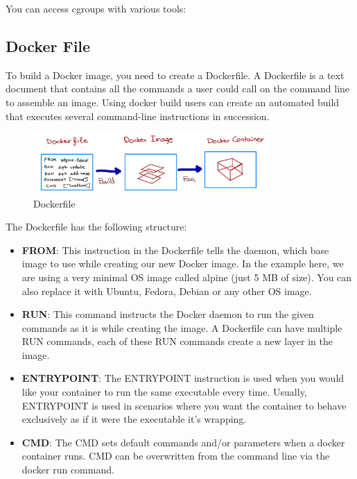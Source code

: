 You can access cgroups with various tools:

\subsection{Docker File}

To build a Docker image, you need to create a Dockerfile. A Dockerfile is a text
document that contains all the commands a user could call on the command line to
assemble an image. Using docker build users can create an automated build that 
executes several command-line instructions in succession.

\begin{figure}[H]
    \centering
    \includegraphics[width=0.8\textwidth]{assets/fig38.png}
    \caption{Dockerfile}
\end{figure}

The Dockerfile has the following structure:
\begin{itemize}
    \item \textbf{FROM}: This instruction in the Dockerfile tells the daemon, which
    base image to use while creating our new Docker image. In the
    example here, we are using a very minimal OS image called alpine
    (just 5 MB of size). You can also replace it with Ubuntu, Fedora,
    Debian or any other OS image.
    \item \textbf{RUN}: This command instructs the Docker daemon to run the given
    commands as it is while creating the image. A Dockerfile can have
    multiple RUN commands, each of these RUN commands create a
    new layer in the image.
    \item \textbf{ENTRYPOINT}:  The ENTRYPOINT instruction is used when you
    would like your container to run the same executable every time.
    Usually, ENTRYPOINT is used in scenarios where you want the
    container to behave exclusively as if it were the executable it's
    wrapping.
    \item \textbf{CMD}: The CMD sets default commands and/or parameters when a
    docker container runs. CMD can be overwritten from the command
    line via the docker run command.
\end{itemize}

